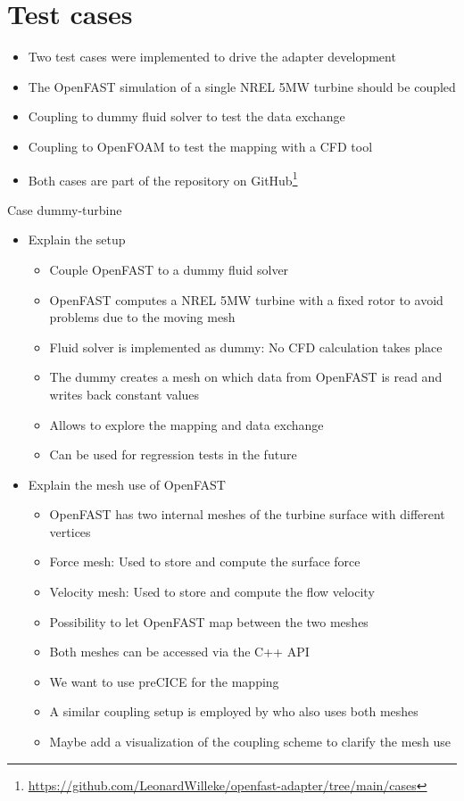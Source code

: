 \section{Test cases}
\label{section:cases}

\begin{itemize}
	\item Two test cases were implemented to drive the adapter development
	\item The OpenFAST simulation of a single NREL 5MW turbine \cite{Jonkman:2009} should be coupled
	\item Coupling to dummy fluid solver to test the data exchange
	\item Coupling to OpenFOAM to test the mapping with a CFD tool
	\item Both cases are part of the repository on GitHub\footnote{\url{https://github.com/LeonardWilleke/openfast-adapter/tree/main/cases}}\\
\end{itemize}

Case dummy-turbine
\begin{itemize}
	\item Explain the setup
	\begin{itemize}
		\item Couple OpenFAST to a dummy fluid solver
		\item OpenFAST computes a NREL 5MW turbine with a fixed rotor to avoid problems due to the moving mesh
		\item Fluid solver is implemented as dummy: No CFD calculation takes place
		\item The dummy creates a mesh on which data from OpenFAST is read and writes back constant values
		\item Allows to explore the mapping and data exchange
		\item Can be used for regression tests in the future
	\end{itemize}
	\item Explain the mesh use of OpenFAST
	\begin{itemize}
		\item OpenFAST has two internal meshes of the turbine surface with different vertices
		\item Force mesh: Used to store and compute the surface force
		\item Velocity mesh: Used to store and compute the flow velocity
		\item Possibility to let OpenFAST map between the two meshes
		\item Both meshes can be accessed via the C++ API
		\item We want to use preCICE for the mapping
		\item A similar coupling setup is employed by \cite{Taschner:2022} who also uses both meshes
		\item Maybe add a visualization of the coupling scheme to clarify the mesh use\\
	\end{itemize}
\end{itemize}

